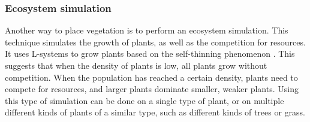 \documentclass{article}
\begin{document}
\subsubsection{Ecosystem simulation} \label{sec:background/ecosystemsim}
Another way to place vegetation is to perform an ecosystem simulation. This technique simulates the growth of plants, as well as the competition for resources. It uses L-systems to grow plants based on the self-thinning phenomenon \cite{deussen_realistic_1998} \cite{lane_generating_2002}. This suggests that when the density of plants is low, all plants grow without competition. When the population has reached a certain density, plants need to compete for resources, and larger plants dominate smaller, weaker plants. Using this type of simulation can be done on a single type of plant, or on multiple different kinds of plants of a similar type, such as different kinds of trees or grass.







\end{document}
